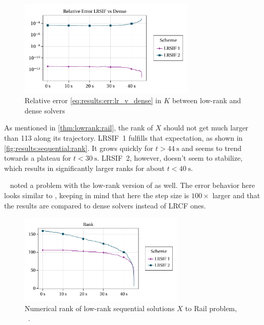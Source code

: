 \begin{figure}[tp]
  \centering
  \includegraphics[width=0.75\textwidth]{figures/fig_results_sequential_err.pdf}
  \caption[Relative error between low-rank and dense solvers]{%
    Relative error \eqref{eq:results:err:lr_v_dense} in $K$ between low-rank and dense solvers
  }
  \label{fig:results:sequential:err}
\end{figure}

As mentioned in \autoref{thm:lowrank:rail},
the rank of $X$ should not get much larger than 113 along its trajectory.
\ac{LRSIF}~1 fulfills that expectation, as shown in \autoref{fig:results:sequential:rank}.
It grows quickly for $t > \SI{44}{\second}$ and seems to trend towards a plateau for $t< \SI{30}{\second}$.
\ac{LRSIF}~2, however, doesn't seem to stabilize,
which results in significantly larger ranks for about $t < \SI{40}{\second}$.

\begin{remark}
  \citeauthor{Lang2015}~\cite[63]{Lang2015} noted a problem with the low-rank version of  as well.
  The error behavior here looks similar to \cite[Fig~1]{Lang2015},
  keeping in mind that here the step size is $100\times$ larger
  and that the results are compared to dense solvers instead of \ac{LRCF} ones.
\end{remark}

\begin{figure}[tp]
  \centering
  \includegraphics[width=0.7\textwidth]{figures/fig_results_sequential_rank.pdf}
  \caption[Numerical rank of low-rank sequential solutions to Rail problem]{%
    Numerical rank of low-rank sequential solutions $X$ to Rail problem,
    \cf~\cite[Figure~6.6b]{Lang2017}.
  }
  \label{fig:results:sequential:rank}
\end{figure}

